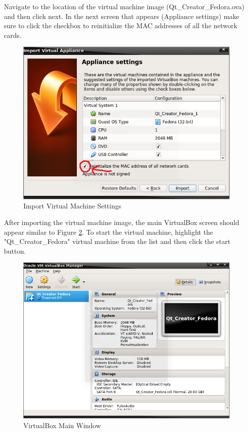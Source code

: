 \documentclass{article}
\begin{document}
Navigate to the location of the virtual machine image (Qt\_Creator\_Fedora.ova) and then click next. In the next screen that appears (Appliance settings) make sure to click the checkbox to reinitialize the MAC addresses of all the network cards.


	\begin{figure}[H]
		\centering
		\includegraphics[scale=0.75]{pics/VirtualBox_Appliance_Settings.png}
		\caption{Import Virtual Machine Settings}
		\label{Import_Virtual_Machine_Settings}
	\end{figure}

After importing the virtual machine image, the main VirtualBox screen should appear similar to Figure \ref{VirtualBox_Main_Window}. To start the virtual machine, highlight the "Qt\_Creator\_Fedora" virtual machine from the list and then click the start button.

	\begin{figure}[H]
		\centering
		\includegraphics[scale=0.35]{pics/VirtualBox_Main_View.png}
		\caption{VirtualBox Main Window}
		\label{VirtualBox_Main_Window}
	\end{figure}
\end{document}
